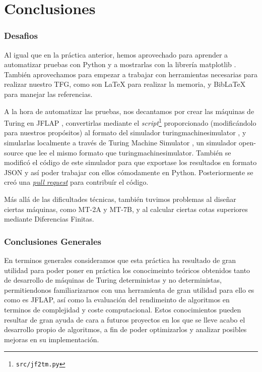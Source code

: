 \part{Conclusiones}

\section{Desafios}
Al igual que en la práctica anterior, hemos aprovechado para aprender a automatizar pruebas con Python y a mostrarlas con la librería matplotlib \parencite{matplotlib}. También aprovechamos para empezar a trabajar con herramientas necesarias para realizar nuestro TFG, como son \LaTeX \parencite{latex} para realizar la memoria, y BibLaTeX \parencite{biblatex} para manejar las referencias.\medskip

A la hora de automatizar las pruebas, nos decantamos por crear las máquinas de Turing en JFLAP \parencite{jflap}, convertirlas mediante el \textit{script}\footnote{\texttt{src/jf2tm.py}} proporcionado (modificándolo para nuestros propósitos) al formato del simulador turingmachinesimulator \parencite{turingmachinesimulator}, y simularlas localmente a través de Turing Machine Simulator \parencite{tmsimulator}, un simulador open-source que lee el mismo formato que turingmachinesimulator. También se modificó el código de este simulador para que exportase los resultados en formato JSON \parencite{json} y así poder trabajar con ellos cómodamente en Python. Posteriormente se creó una \href{https://github.com/fcortes/turing-machine-simulator/pull/2}{\textit{pull request}} para contribuír el código.\medskip

Más allá de las dificultades técnicas, también tuvimos problemas al diseñar ciertas máquinas, como MT-2A y MT-7B, y al calcular ciertas cotas superiores mediante Diferencias Finitas.


\section{Conclusiones Generales}

En terminos generales consideramos que esta práctica ha resultado de gran utilidad para poder poner en práctica los conocimeinto teóricos obtenidos tanto de desarrollo de máquinas de Turing deterministas y no deterministas, permitiendonos familiarizarnos con una herramienta de gran utilidad para ello es como es JFLAP, así como la evaluación del rendimeinto de algoritmos en terminos de complejidad y coste computacional.
Estos conocimientos pueden resultar de gran ayuda de cara a futuros proyectos en los que se lleve acabo el desarrollo propio de algoritmos, a fin de poder optimizarlos y analizar posibles mejoras en su implementación.

